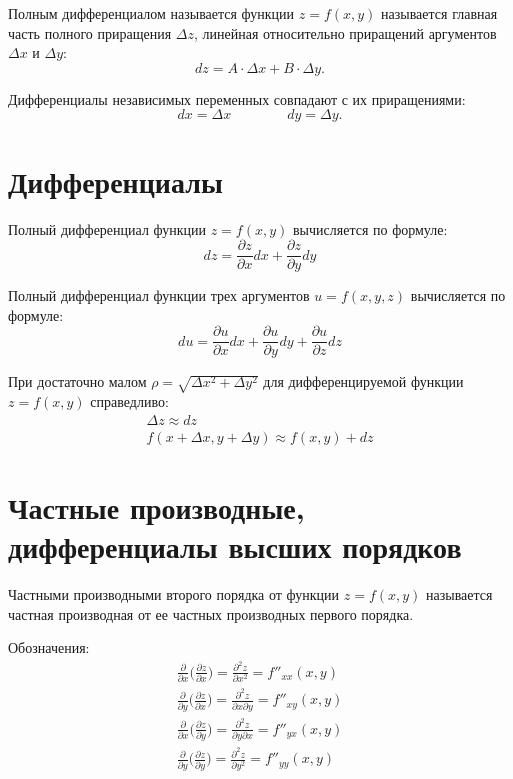 \documentclass[a4paper,12pt,oneside]{extbook}
\theoremstyle{numbered}
\theoremstyle{unnumbered}
\theoremstyle{named}
\theoremstyle{unnumbered}
\theoremstyle{named}
\theoremstyle{named}
\theoremstyle{named}
\begin{document}
Полным дифференциалом называется функции \(z = f(x, y)\) называется главная часть полного приращения \(\Delta z\), линейная относительно приращений аргументов \(\Delta x\) и \(\Delta y\):
\begin{equation}
    dz = A \cdot \Delta x + B \cdot \Delta y.
\end{equation}

Дифференциалы независимых переменных совпадают с их приращениями:
\begin{equation}
    dx = \Delta x \qquad \qquad dy = \Delta y.
\end{equation}

\section{Дифференциалы}%
\label{sec:Дифференциалы}

Полный дифференциал функции \(z = f(x, y)\) вычисляется по формуле:
\begin{equation}
    dz = \frac{\partial z}{\partial x}dx + \frac{\partial z}{\partial y}dy
\end{equation}

Полный дифференциал функции трех аргументов \(u = f(x, y, z)\) вычисляется по формуле:
\begin{equation}
    du = \frac{\partial u}{\partial x}dx + \frac{\partial u}{\partial y}dy + \frac{\partial u}{\partial z}dz
\end{equation}

При достаточно малом \(\rho = \sqrt{\Delta x^2 + \Delta y^2}\) для дифференцируемой функции \(z = f(x, y)\) справедливо:
\begin{gather}
    \Delta z \approx dz \\
    f(x + \Delta x, y + \Delta y) \approx f(x, y) + dz
\end{gather}

\section{Частные производные, дифференциалы высших порядков}%
\label{sec:Частные производные, дифференциалы высших порядков}

Частными производными второго порядка от функции \(z = f(x, y)\) называется частная производная от ее частных производных первого порядка.

Обозначения:
\begin{gather*}
    \frac{\partial}{\partial x} \Big(\frac{\partial z}{\partial x}\Big) = \frac{\partial^2 z}{\partial x^2} = f''_{xx}(x, y) \\
    \frac{\partial}{\partial y} \Big(\frac{\partial z}{\partial x}\Big) = \frac{\partial^2 z}{\partial x \partial y} = f''_{xy}(x, y) \\
    \frac{\partial}{\partial x} \Big(\frac{\partial z}{\partial y}\Big) = \frac{\partial^2 z}{\partial y \partial x} = f''_{yx}(x, y) \\
    \frac{\partial}{\partial y} \Big(\frac{\partial z}{\partial y}\Big) = \frac{\partial^2 z}{\partial y^2} = f''_{yy}(x, y)
\end{gather*}
\end{document}
